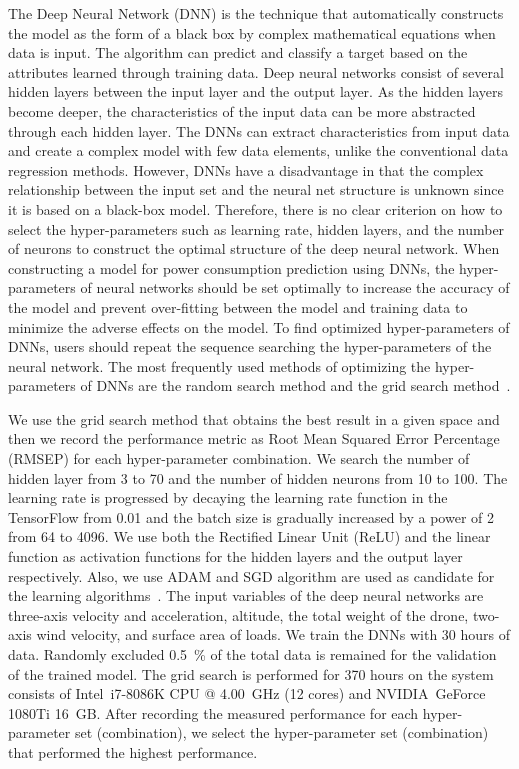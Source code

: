 \documentclass[journal]{./template/IEEEtran}
\begin{document}
The Deep Neural Network (DNN) is the technique that automatically constructs the model as the form of a black box by complex mathematical equations when data is input.
The algorithm can predict and classify a target based on the attributes learned through training data. 
Deep neural networks consist of several hidden layers between the input layer and the output layer.
As the hidden layers become deeper, the characteristics of the input data can be more abstracted through each hidden layer.
The DNNs can extract characteristics from input data and create a complex model with few data elements, unlike the conventional data regression methods.
However, DNNs have a disadvantage in that the complex relationship between the input set and the neural net structure is unknown since it is based on a black-box model. 
Therefore, there is no clear criterion on how to select the hyper-parameters such as learning rate, hidden layers, and the number of neurons to construct the optimal structure of the deep neural network. 
When constructing a model for power consumption prediction using DNNs, the hyper-parameters of neural networks should be set optimally to increase the accuracy of the model and prevent over-fitting between the model and training data to minimize the adverse effects on the model.
To find optimized hyper-parameters of DNNs, users should repeat the sequence searching the hyper-parameters of the neural network. 
The most frequently used methods of optimizing the hyper-parameters of DNNs are the random search method and the grid search method~\cite{ref_16}. 

We use the grid search method that obtains the best result in a given space and then we record the performance metric as Root Mean Squared Error Percentage (RMSEP) for each hyper-parameter combination.
We search the number of hidden layer from 3 to 70 and the number of hidden neurons from 10 to 100. 
The learning rate is progressed by decaying the learning rate function in the TensorFlow from 0.01 and the batch size is gradually increased by a power of 2 from 64 to 4096.
We use both the Rectified Linear Unit (ReLU) and the linear function as activation functions for the hidden layers and the output layer respectively. 
Also, we use ADAM and SGD algorithm are used as candidate for the learning algorithms~\cite{ref_17}. 
The input variables of the deep neural networks are three-axis velocity and acceleration, altitude, the total weight of the drone, two-axis wind velocity, and surface area of loads. 
We train the DNNs with 30 hours of data. Randomly excluded 0.5~\% of the total data is remained for the validation of the trained model.
The grid search is performed for 370 hours on the system consists of Intel\textregistered ~i7-8086K CPU @ 4.00~GHz (12 cores) and NVIDIA\textregistered ~GeForce 1080Ti 16~GB.
After recording the measured performance for each hyper-parameter set (combination), we select the hyper-parameter set (combination) that performed the highest performance.
\end{document}
